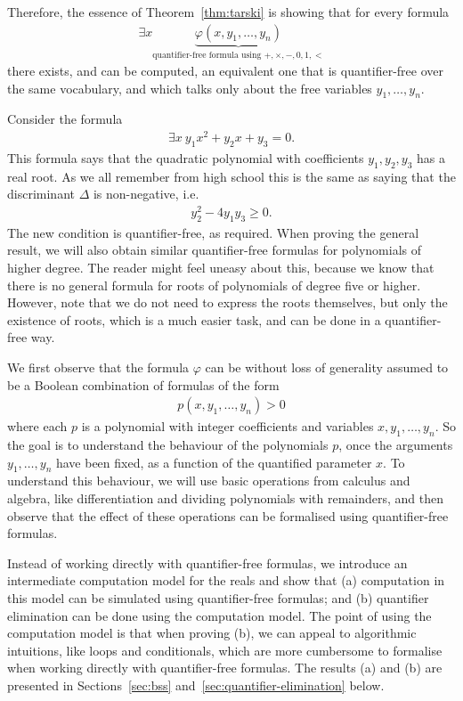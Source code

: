 Therefore, the essence of Theorem~\ref{thm:tarski} is showing that for every
formula 
\begin{align*}
  \exists x \underbrace{\varphi(x,y_1,\ldots,y_n) }_{\text{quantifier-free formula using $+,\times,-,0,1,<$}}
\end{align*}
there exists, and can be computed, an equivalent one that is quantifier-free over the same vocabulary, and which talks only about the free variables $y_1,\ldots,y_n$.

\begin{example}
Consider the formula 
\begin{align*}
\exists x \ y_1 x^2 + y_2 x + y_3 = 0.
\end{align*}
This formula says that the quadratic polynomial with coefficients $y_1,y_2,y_3$ has a real root. As we all remember from high school this is the same as saying that the discriminant $\Delta$ is non-negative, i.e.
\begin{align*}
y_2^2 - 4 y_1 y_3 \geq 0.
\end{align*}
The new condition is quantifier-free, as required. When proving the general result, we will also obtain similar quantifier-free formulas for polynomials of higher degree. The reader might feel uneasy about this, because we know that there is no general formula for roots of polynomials of degree five or higher. However, note that we do not need to express the roots themselves, but only the existence of roots, which is a much easier task, and can be done in a quantifier-free way.
\end{example}

We first observe that the formula $\varphi$ can be without loss of generality assumed to be a Boolean combination of formulas of the form
\begin{align*}
  p(x,y_1,\ldots,y_n) > 0
\end{align*}
where each $p$ is a polynomial with integer coefficients and variables $x,y_1,\ldots,y_n$. So the goal is to understand the behaviour of the polynomials $p$, once the arguments $y_1,\ldots,y_n$ have been fixed, as a function of the quantified parameter $x$. To understand this behaviour, we will use basic operations from calculus and algebra, like differentiation and dividing polynomials with remainders, and then observe that the effect of these operations can be formalised using quantifier-free formulas. 

Instead of working directly with quantifier-free formulas, we introduce an intermediate computation model for the reals and show that (a) computation in this model can be simulated using quantifier-free formulas; and (b) quantifier elimination can be done using the computation model. The point of using the computation model is that when proving (b), we can appeal to algorithmic intuitions, like loops and conditionals, which are more cumbersome to formalise when working directly with quantifier-free formulas. The results (a) and (b) are presented in Sections~\ref{sec:bss} and~\ref{sec:quantifier-elimination} below.







